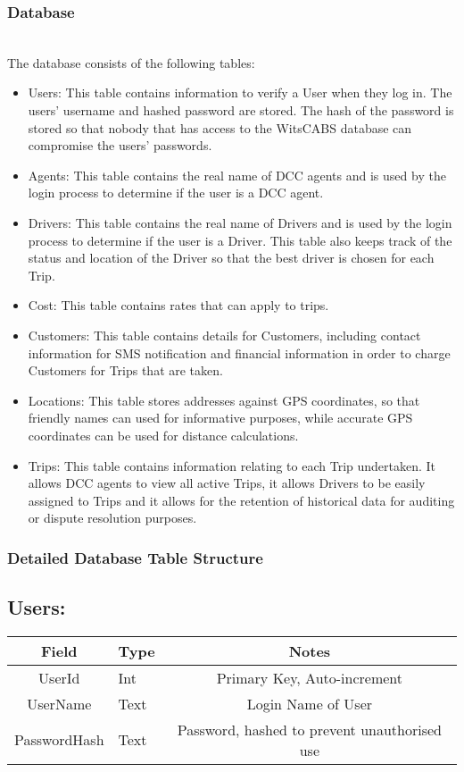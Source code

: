 \documentclass[10pt, onecolumn]{witseiepaper}
\begin{document}
\subsubsection{Database}\mbox{}\\
The database consists of the following tables:
\begin{itemize}
\item Users: This table contains information to verify a User when they log in. The users' username and hashed password are stored. The hash of the password is stored so that nobody that has access to the WitsCABS database can compromise the users' passwords.
\item Agents: This table contains the real name of DCC agents and is used by the login process to determine if the user is a DCC agent.
\item Drivers: This table contains the real name of Drivers and is used by the login process to determine if the user is a Driver. This table also keeps track of the status and location of the Driver so that the best driver is chosen for each Trip.
\item Cost: This table contains rates that can apply to trips.
\item Customers: This table contains details for Customers, including contact information for SMS notification and financial information in order to charge Customers for Trips that are taken.
\item Locations: This table stores addresses against GPS coordinates, so that friendly names can used for informative purposes, while accurate GPS coordinates can be used for distance calculations.
\item Trips: This table contains information relating to each Trip undertaken. It allows DCC agents to view all active Trips, it allows Drivers to be easily assigned to Trips and it allows for the retention of historical data for auditing or dispute resolution purposes.
\end{itemize}

\subsubsection{Detailed Database Table Structure}
\subsection*{Users:}
\begin{tabular}{|c|l|c|}
\hline 
Field & Type & Notes\\ 
\hline 
UserId & Int & Primary Key, Auto-increment\\
\hline 
UserName & Text & Login Name of User\\
\hline 
PasswordHash & Text & Password, hashed to prevent unauthorised use\\
\hline
\end{tabular}
\end{document}
